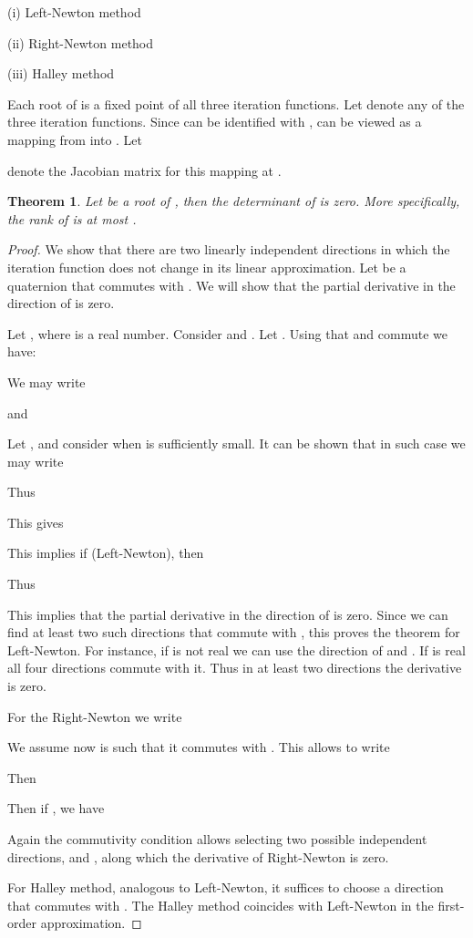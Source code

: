 \documentclass{article}
\newtheorem{thm}{Theorem}
\theoremstyle{definition}
\begin{document}
\noindent (i) Left-Newton method

(ii) Right-Newton method

(iii) Halley method

Each root of  is  a fixed point of all three iteration functions. Let  denote any of the three iteration functions. Since
 can be identified with ,
 can be viewed as a mapping from  into . Let

denote the  Jacobian matrix for this mapping at .

\begin{thm} \label{inv} Let  be a root of , then the determinant of  is zero. More specifically, the rank of  is at most .
\end{thm}

\begin{proof}   We show that there are two linearly independent directions in which the iteration function  does not change in its linear approximation.  Let  be a quaternion that commutes with .
We will show that the partial derivative  in the direction of  is zero.

Let , where  is a real number.  Consider  and .  Let . Using that  and  commute we have:

We may write

and

Let
, and consider  when  is sufficiently small.  It can be shown that in such case we may write

Thus

This gives


This implies if  (Left-Newton), then

Thus

This implies that the partial derivative  in the direction of  is zero.  Since we can find at least two such directions  that commute with , this proves the theorem for Left-Newton. For instance, if  is not real we can use the direction of  and . If  is real all four directions commute with it.  Thus in at least two directions the derivative is zero.

For the Right-Newton we write

We assume now  is such that it commutes with . This allows to write

Then

Then if , we have

Again the commutivity  condition  allows selecting two possible independent directions,   and , along which the derivative of Right-Newton is zero.

For Halley method, analogous to Left-Newton, it suffices to choose  a direction that commutes with .  The Halley method coincides with Left-Newton in the first-order approximation.
\end{proof}
\end{document}
